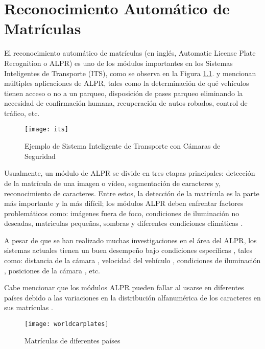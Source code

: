 \chapter{Reconocimiento Automático de Matrículas}

El reconocimiento automático de matrículas (en inglés, Automatic License Plate Recognition o ALPR) es uno de los módulos importantes en los Sistemas Inteligentes de Transporte (ITS), como se observa en la Figura \ref{fig:its}.  y  mencionan múltiples aplicaciones de ALPR, tales como la determinación de qué vehículos tienen acceso o no a un parqueo, disposición de pases parqueo eliminando la necesidad de confirmación humana, recuperación de autos robados, control de tráfico, etc.
\begin{figure}[H]
        \centering
        \texttt{[image: its]}
        \caption{Ejemplo de Sistema Inteligente de Transporte con Cámaras de Seguridad \protect\cite{TechFAQ2016-oi}}
        \label{fig:its}
\end{figure}   

Usualmente, un módulo de ALPR se divide en tres etapas principales: detección de la matrícula de una imagen o vídeo, segmentación de caracteres y, reconocimiento de caracteres. Entre estos, la detección de la matrícula es la parte más importante y la más difícil; los módulos ALPR deben enfrentar factores problemáticos como: imágenes fuera de foco, condiciones de iluminación no deseadas, matriculas pequeñas, sombras y diferentes condiciones climáticas \cite{Mahini2006-us}.

A pesar de que se han realizado muchas investigaciones en el área del ALPR, los sistemas actuales tienen un buen desempeño bajo condiciones específicas \cite{Anagnostopoulos2006-is}, tales como: distancia de la cámara \cite{Martin2002-zu,Guo2008-qk}, velocidad del vehículo \cite{Garibotto2001-lu}, condiciones de iluminación \cite{Xiong2004-qv,Mahini2006-us}, posiciones de la cámara \cite{Chang2004-kg}, etc. 

Cabe mencionar que los módulos ALPR pueden fallar al usarse en diferentes países debido a las variaciones en la distribución alfanumérica de los caracteres en sus matrículas \cite{Anagnostopoulos2006-is,Shapiro2006-rv,Mecocci2006-nt}.

  \begin{figure}[H]
        \centering
        \texttt{[image: worldcarplates]}
        \caption{ Matrículas de diferentes países \protect\cite{Kustermann2016-yd}}
        \label{fig:worldcarplates}
\end{figure}  

